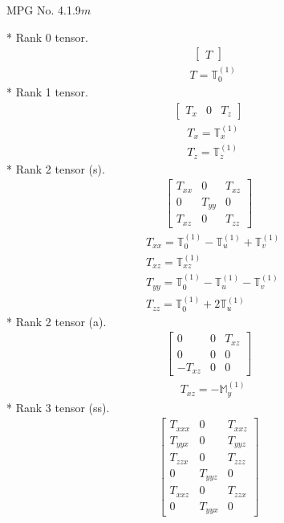 \documentclass[fleqn,8pt,landscape]{jsarticle}
\begin{document}
\setcounter{MaxMatrixCols}{32}

\renewcommand{\tablename}{Table~}
\renewcommand{\figurename}{Figure~}
\begin{center}
\LARGE
MPG No. 4.1.9\quad$m$
\end{center}
* Rank 0 tensor.
\begin{align*}
\begin{bmatrix} T \end{bmatrix}
\end{align*}
\begin{align*}
& T = \mathbb{T}_{0}^{(1)}
\end{align*}
* Rank 1 tensor.
\begin{align*}
\begin{bmatrix} T_{x} & 0 & T_{z} \end{bmatrix}
\end{align*}
\begin{align*}
& T_{x} = \mathbb{T}_{x}^{(1)} \\
& T_{z} = \mathbb{T}_{z}^{(1)}
\end{align*}
* Rank 2 tensor (s).
\begin{align*}
\begin{bmatrix} T_{xx} & 0 & T_{xz} \\ 0 & T_{yy} & 0 \\ T_{xz} & 0 & T_{zz} \end{bmatrix}
\end{align*}
\begin{align*}
& T_{xx} = \mathbb{T}_{0}^{(1)} - \mathbb{T}_{u}^{(1)} + \mathbb{T}_{v}^{(1)} \\
& T_{xz} = \mathbb{T}_{xz}^{(1)} \\
& T_{yy} = \mathbb{T}_{0}^{(1)} - \mathbb{T}_{u}^{(1)} - \mathbb{T}_{v}^{(1)} \\
& T_{zz} = \mathbb{T}_{0}^{(1)} + 2 \mathbb{T}_{u}^{(1)}
\end{align*}
* Rank 2 tensor (a).
\begin{align*}
\begin{bmatrix} 0 & 0 & T_{xz} \\ 0 & 0 & 0 \\ - T_{xz} & 0 & 0 \end{bmatrix}
\end{align*}
\begin{align*}
& T_{xz} = - \mathbb{M}_{y}^{(1)}
\end{align*}
* Rank 3 tensor (ss).
\begin{align*}
\begin{bmatrix} T_{xxx} & 0 & T_{xxz} \\ T_{yyx} & 0 & T_{yyz} \\ T_{zzx} & 0 & T_{zzz} \\ 0 & T_{yyz} & 0 \\ T_{xxz} & 0 & T_{zzx} \\ 0 & T_{yyx} & 0 \end{bmatrix}
\end{align*}
\end{document}
